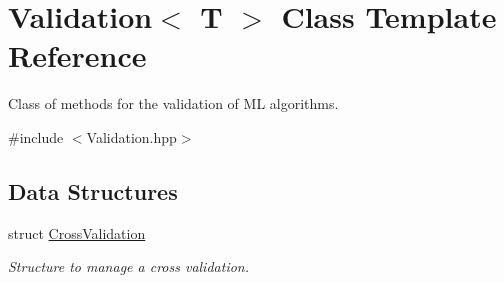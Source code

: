 \hypertarget{class_validation}{}\section{Validation$<$ T $>$ Class Template Reference}
\label{class_validation}


Class of methods for the validation of ML algorithms.  




{\ttfamily \#include $<$Validation.\+hpp$>$}

\subsection*{Data Structures}
\begin{DoxyCompactItemize}
\item 
struct \hyperlink{struct_validation_1_1_cross_validation}{Cross\+Validation}
\begin{DoxyCompactList}\small\item\em Structure to manage a cross validation. \end{DoxyCompactList}\end{DoxyCompactItemize}
